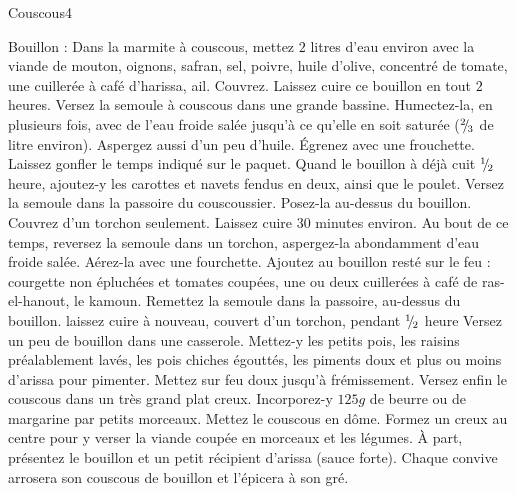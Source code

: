 \begin{recette}{Couscous}{4}{}{}
\begin{preparation}
\etape Bouillon : Dans la marmite à couscous, mettez $2$ litres d'eau environ avec la viande de mouton, oignons, safran, sel, poivre, huile d'olive, concentré de tomate, une cuillerée à café d'harissa, ail. Couvrez. Laissez cuire ce bouillon en tout $2$ heures.
\etape Versez la semoule à couscous dans une grande bassine. Humectez-la, en plusieurs fois, avec de l'eau froide salée jusqu'à ce qu'elle en soit saturée (${{}^{2\!\!}/ _{\!3}}$ de litre environ). Aspergez aussi d'un peu d'huile. Égrenez avec une frouchette. Laissez gonfler le temps indiqué sur le paquet.
\etape Quand le bouillon à déjà cuit ${{}^{1\!\!}/ _{\!2}}$ heure, ajoutez-y les carottes et navets fendus en deux, ainsi que le poulet.
\etape Versez la semoule dans la passoire du couscoussier. Posez-la au-dessus du bouillon. Couvrez d'un torchon seulement. Laissez cuire $30$ minutes environ.
\etape Au bout de ce temps, reversez la semoule dans un torchon, aspergez-la abondamment d'eau froide salée. Aérez-la avec une fourchette.
\etape Ajoutez au bouillon resté sur le feu : courgette non épluchées et tomates coupées, une ou deux cuillerées à café de ras-el-hanout, le kamoun. Remettez la semoule dans la passoire, au-dessus du bouillon. laissez cuire à nouveau, couvert d'un torchon, pendant ${{}^{1\!\!}/ _{\!2}}$ heure
\etape Versez un peu de bouillon dans une casserole. Mettez-y les petits pois, les raisins préalablement lavés, les pois chiches égouttés, les piments doux et plus ou moins d'arissa pour pimenter. Mettez sur feu doux jusqu'à frémissement.
\etape Versez enfin le couscous dans un très grand plat creux. Incorporez-y $125\unit{g}$ de beurre ou de margarine par petits morceaux. Mettez le couscous en dôme. Formez un creux au centre pour y verser la viande coupée en morceaux et les légumes. À part, présentez le bouillon et un petit récipient d'arissa (sauce forte). Chaque convive arrosera son couscous de bouillon et l'épicera à son gré.
\end{preparation}

\end{recette}

